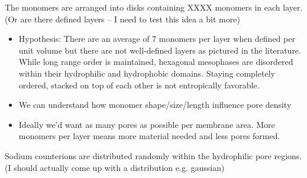 \documentclass{article}
\begin{document}
	The monomers are arranged into disks containing XXXX monomers in each layer. (Or are there defined layers -- I need to test this idea a bit more) 
	\begin{itemize}
		\item Hypothesis: There are an average of 7 monomers per layer when defined per unit volume but there are not well-defined layers as pictured in the literature. While long range order is maintained, hexagonal mesophases are disordered within their hydrophilic and hydrophobic domains. Staying completely ordered, stacked on top of each other is not entropically favorable.
		\item We can understand how monomer shape/size/length influence pore density
		\item Ideally we'd want as many pores as possible per membrane area. More monomers per layer means more material needed and less pores formed. 
	\end{itemize}
	Sodium counterions are distributed randomly within the hydrophilic pore regions. (I should actually come up with a distribution e.g. gaussian)
\end{document}
